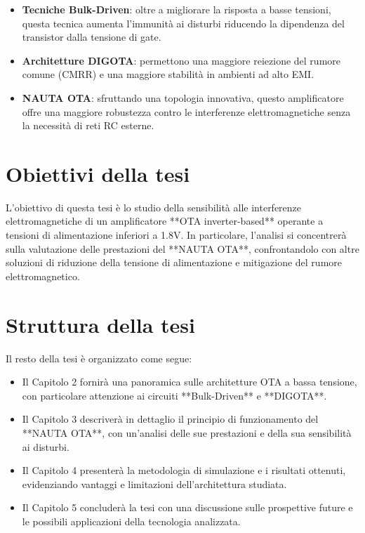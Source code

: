 \documentclass[oneside, a4paper]{book}
\begin{document}
\begin{itemize}
    \item \textbf{Tecniche Bulk-Driven}: oltre a migliorare la risposta a basse tensioni, questa tecnica aumenta l'immunità ai disturbi riducendo la dipendenza del transistor dalla tensione di gate.
    \item \textbf{Architetture DIGOTA}: permettono una maggiore reiezione del rumore comune (CMRR) e una maggiore stabilità in ambienti ad alto EMI.
    \item \textbf{NAUTA OTA}: sfruttando una topologia innovativa, questo amplificatore offre una maggiore robustezza contro le interferenze elettromagnetiche senza la necessità di reti RC esterne.
\end{itemize}

\section{Obiettivi della tesi}
L'obiettivo di questa tesi è lo studio della sensibilità alle interferenze elettromagnetiche di un amplificatore **OTA inverter-based** operante a tensioni di alimentazione inferiori a 1.8V. In particolare, l'analisi si concentrerà sulla valutazione delle prestazioni del **NAUTA OTA**, confrontandolo con altre soluzioni di riduzione della tensione di alimentazione e mitigazione del rumore elettromagnetico.

\section{Struttura della tesi}
Il resto della tesi è organizzato come segue:
\begin{itemize}
    \item Il Capitolo 2 fornirà una panoramica sulle architetture OTA a bassa tensione, con particolare attenzione ai circuiti **Bulk-Driven** e **DIGOTA**.
    \item Il Capitolo 3 descriverà in dettaglio il principio di funzionamento del **NAUTA OTA**, con un'analisi delle sue prestazioni e della sua sensibilità ai disturbi.
    \item Il Capitolo 4 presenterà la metodologia di simulazione e i risultati ottenuti, evidenziando vantaggi e limitazioni dell'architettura studiata.
    \item Il Capitolo 5 concluderà la tesi con una discussione sulle prospettive future e le possibili applicazioni della tecnologia analizzata.
\end{itemize}
\end{document}
